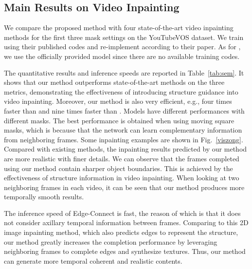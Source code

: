 




\subsection{Main Results on Video Inpainting}
We compare the proposed method with four state-of-the-art video inpainting methods \cite{nazeri2019edgeconnect,wang2019video,Kim_2019_CVPR1,Xu_2019_CVPR}
for the first three mask settings on the YouTubeVOS dataset.
%
We train \cite{nazeri2019edgeconnect,Xu_2019_CVPR} using their published codes and re-implement \cite{wang2019video} according to their paper. As for \cite{Kim_2019_CVPR1}, we use the officially provided model since there are no available training codes.

The quantitative results and inference speeds are reported in Table~\ref{tab:sem}.
It shows that our method outperforms state-of-the-art methods on the three metrics, demonstrating the effectiveness of introducing structure guidance into video inpainting.
Moreover, our method is also very efficient, e.g., four times faster than \cite{Kim_2019_CVPR1} and nine  times faster than \cite{Xu_2019_CVPR}. 
%
Models have different performances with different masks. The best performance is obtained when using moving square masks, which is because that the network can learn complementary information from neighboring frames.
Some inpainting examples are shown in Fig.~\ref{viszong}.
Compared with existing methods, the inpainting results predicted by our method are more realistic with finer details. 
We can observe that the frames completed using our method contain sharper object boundaries. This is achieved by the effectiveness of structure information in video inpainting.
%
When looking at two neighboring frames in each video, it can be seen that our method produces more temporally smooth results. 



The inference speed of Edge-Connect \cite{nazeri2019edgeconnect} is fast, the reason of which is that it does not consider axillary temporal  information between frames. 
Comparing to this 2D image inpainting method, which also predicts edges to represent the structure, our method greatly increases the completion performance by leveraging neighboring frames to complete edges and synthesize textures. Thus, our method can generate more temporal coherent and realistic contents.

